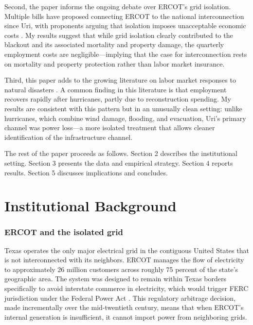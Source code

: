 \documentclass[12pt]{article}
\begin{document}
Second, the paper informs the ongoing debate over ERCOT's grid isolation. Multiple bills have proposed connecting ERCOT to the national interconnection since Uri, with proponents arguing that isolation imposes unacceptable economic costs \citep{rhodes2021texas,king2021failure}. My results suggest that while grid isolation clearly contributed to the blackout and its associated mortality and property damage, the quarterly employment costs are negligible---implying that the case for interconnection rests on mortality and property protection rather than labor market insurance.

Third, this paper adds to the growing literature on labor market responses to natural disasters \citep{deryugina2017fiscal,groen2020hurricanes,belasen2008hurricanes}. A common finding in this literature is that employment recovers rapidly after hurricanes, partly due to reconstruction spending. My results are consistent with this pattern but in an unusually clean setting: unlike hurricanes, which combine wind damage, flooding, and evacuation, Uri's primary channel was power loss---a more isolated treatment that allows cleaner identification of the infrastructure channel.

The rest of the paper proceeds as follows. Section 2 describes the institutional setting. Section 3 presents the data and empirical strategy. Section 4 reports results. Section 5 discusses implications and concludes.


\section{Institutional Background}

\subsubsection*{ERCOT and the isolated grid} Texas operates the only major electrical grid in the contiguous United States that is not interconnected with its neighbors. ERCOT manages the flow of electricity to approximately 26 million customers across roughly 75 percent of the state's geographic area. The system was designed to remain within Texas borders specifically to avoid interstate commerce in electricity, which would trigger FERC jurisdiction under the Federal Power Act \citep{rhodes2021texas}. This regulatory arbitrage decision, made incrementally over the mid-twentieth century, means that when ERCOT's internal generation is insufficient, it cannot import power from neighboring grids.
\end{document}
